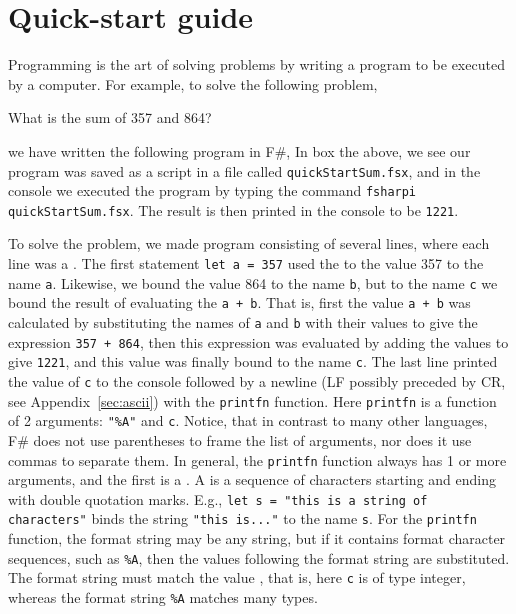 \chapter{Quick-start guide}
Programming is the art of solving problems by writing a program to be executed by a computer. For example, to solve the following problem,
%
\begin{problem}
  What is the sum of 357 and 864?
\end{problem}
%
we have written the following program in F\#,
%
%
In box the above, we see our program was saved as a script in a file called \lstinline[language=console]{quickStartSum.fsx}, and in the console we executed the program by typing the command \lstinline|fsharpi quickStartSum.fsx|. The result is then printed in the console to be \lstinline{1221}.

To solve the problem, we made program consisting of several lines, where each line was a . The first statement \lstinline|let a = 357| used the   to  the value 357 to the name \lstinline|a|. Likewise, we bound the value 864 to the name \lstinline|b|, but to the name \lstinline|c| we bound the result of evaluating the  \lstinline|a + b|. That is, first the value \lstinline|a + b| was calculated by substituting the names of \lstinline|a| and \lstinline|b| with their values to give the expression \lstinline|357 + 864|, then this expression was evaluated by adding the values to give \lstinline|1221|, and this value was finally bound to the name \lstinline|c|. The last line printed the value of \lstinline|c| to the console followed by a newline (LF possibly preceded by CR, see Appendix~\ref{sec:ascii}) with the \lstinline|printfn| function. Here \lstinline|printfn| is a function of 2 arguments: \lstinline|"%A"| %
and \lstinline|c|. Notice, that in contrast to many other languages, F\# does not use parentheses to frame the list of arguments, nor does it use commas to separate them. In general, the \lstinline|printfn| function always has 1 or more arguments, and the first is a . A  is a sequence of characters starting and ending with double quotation marks. E.g., \lstinline|let s = "this is a string of characters"| binds the string \lstinline|"this is..."| to the name \lstinline|s|. For the \lstinline|printfn| function, the format string may be any string, but if it contains format character sequences, such as \lstinline|%A|,
 then the values following the format string are substituted. The format string must match the value , that is, here \lstinline|c| is of type integer, whereas the format string \lstinline|%A| %
matches many types.

